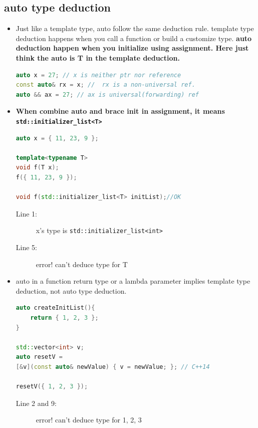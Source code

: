 \documentclass[a4paper,11pt,twoside]{book}
\begin{document}
\subsection{auto type deduction}
\begin{itemize}
	\item Just like a template type, auto follow the same deduction rule. template type deduction happens when you call a function or build a customize type. \textbf{auto deduction happen when you initialize using assignment. Here just think the auto is T in the template deduction.}
	
\begin{lstlisting}[frame=single, language=c++]
auto x = 27; // x is neither ptr nor reference
const auto& rx = x; //  rx is a non-universal ref.
auto && ax = 27; // ax is universal(forwarding) ref
\end{lstlisting}
	
	\item \textbf{When combine auto and brace init in assignment, it means \texttt{std::initializer\_list<T>}}
	
\begin{lstlisting}[frame=single, language=c++]
auto x = { 11, 23, 9 }; 

template<typename T> 
void f(T x);
f({ 11, 23, 9 }); 
	
void f(std::initializer_list<T> initList);//OK
\end{lstlisting}
\begin{description}
	\item[Line 1:] x's type is  \texttt{std::initializer\_list<int>}
	\item[Line 5:] error! can't deduce type for T
\end{description}
	
	\item auto in a function return type or a lambda parameter implies template type deduction, not auto type deduction.
\begin{lstlisting}[frame=single, language=c++]
auto createInitList(){
	return { 1, 2, 3 }; 
}
	
std::vector<int> v;
auto resetV =
[&v](const auto& newValue) { v = newValue; }; // C++14
	
resetV({ 1, 2, 3 }); 
\end{lstlisting}
\begin{description}
	\item[Line 2 and 9:] error! can't deduce type for { 1, 2, 3 }
\end{description}
	

\end{itemize}
\end{document}
